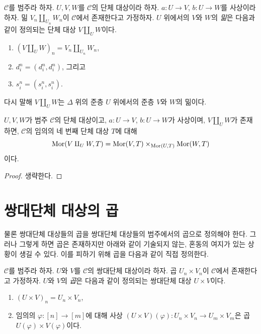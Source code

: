 \begin{definition}
\label{definition-push-out}
$\mathcal{C}$를 범주라 하자.
$U, V, W$를 $\mathcal{C}$의 단체 대상이라 하자.
$a : U \to V$, $b : U \to W$를 사상이라 하자.
밂 $V_n \amalg_{U_n} W_n$이 $\mathcal{C}$에서 존재한다고 가정하자.
{$U$ 위에서의 $V$와 $W$의 {\it 밂}}은 다음과 같이 정의되는 단체 대상
$V\amalg_U W$이다.
\begin{enumerate}
\item $(V \amalg_U W)_n = V_n \amalg_{U_n} W_n$,
\item $d^n_i = (d^n_i, d^n_i)$, 그리고
\item $s^n_i = (s^n_i, s^n_i)$.
\end{enumerate}
다시 말해 $V\amalg_U W$는 $\Delta$ 위의 준층 $U$ 위에서의
준층 $V$와 $W$의 밂이다.
\end{definition}

\begin{lemma}
\label{lemma-push-out}
$U, V, W$가 범주 $\mathcal{C}$의 단체 대상이고,
$a : U \to V$, $b : U \to W$가 사상이며,
$V\amalg_U W$가 존재하면, $\mathcal{C}$의 임의의 네 번째 단체 대상
$T$에 대해
$$
\mathop{\mathrm{Mor}}\nolimits(V\amalg_U W, T) =
\mathop{\mathrm{Mor}}\nolimits(V, T) \times_{\mathop{\mathrm{Mor}}\nolimits(U, T)}
\mathop{\mathrm{Mor}}\nolimits(W, T)
$$
이다.
\end{lemma}

\begin{proof}
생략한다.
\end{proof}












\section{쌍대단체 대상의 곱}
\label{section-products-cosimplicial}

\noindent
물론 쌍대단체 대상들의 곱을 쌍대단체 대상들의 범주에서의 곱으로
정의해야 한다. 그러나 그렇게 하면 곱은 존재하지만 아래와 같이
기술되지 않는, 혼동의 여지가 있는 상황이 생길 수 있다.
이를 피하기 위해 곱을 다음과 같이 직접 정의한다.

\begin{definition}
\label{definition-product-cosimplicial-objects}
$\mathcal{C}$를 범주라 하자.
$U$와 $V$를 $\mathcal{C}$의 쌍대단체 대상이라 하자.
곱 $U_n \times V_n$이 $\mathcal{C}$에서 존재한다고 가정하자.
{$U$와 $V$의 {\it 곱}}은 다음과 같이 정의되는 쌍대단체 대상
$U \times V$이다.
\begin{enumerate}
\item $(U \times V)_n = U_n \times V_n$,
\item 임의의 $\varphi : [n] \to [m]$에 대해 사상
$(U \times V)(\varphi) : U_n \times V_n \to U_m \times V_m$은
곱 $U(\varphi) \times V(\varphi)$이다.
\end{enumerate}
\end{definition}

